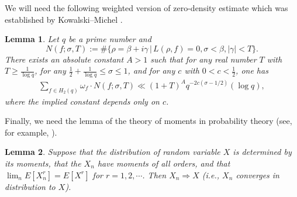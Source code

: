 \documentclass[11pt,reqno]{amsart}
\newcommand{\bna}{\begin{eqnarray*}}
\newcommand{\ena}{\end{eqnarray*}}
\numberwithin{equation}{section}
\theoremstyle{plain}
\newtheorem{lemma}{Lemma}[section]
\theoremstyle{definition}
\begin{document}
We will need the following weighted version of zero-density estimate
which was established by Kowalski--Michel \cite[Theorem 4]{KM1}.
\begin{lemma}\label{zero-density}
Let $q$ be a prime number and $$N(f; \sigma, T):=\#\{\rho=\beta+i\gamma \,|\, L(\rho,f)=0, \sigma<\beta, |\gamma|<T\}.$$
There exists an absolute constant $A>1$ such that for any real number $T$ with $T\geq \frac{1}{\log q}$,
for any $\frac{1}{2}+\frac{1}{\log q}\leq\sigma\leq 1$, and for any $c$ with $0<c<\frac{1}{2}$, one has
\bna
\sum_{f\in H_2(q)}\omega_f\cdot N(f; \sigma, T)\ll (1+T)^Aq^{-2c(\sigma-1/2)}(\log q),
\ena
where the implied constant depends only on $c$.
\end{lemma}
Finally, we need the lemma of the theory of moments in probability theory (see, for example, \cite[Theorem 30.2]{Billingsley}).
\begin{lemma}\label{probability theory}
Suppose that the distribution of random variable $X$ is determined by its moments, that the $X_n$ have moments of all orders, and that
$\lim_n E[X_n^r]=E[X^r]$ for $r=1,2,\cdots$. Then $X_n\Rightarrow X$ (i.e., $X_n$ converges in distribution to $X$).
\end{lemma}
\end{document}
